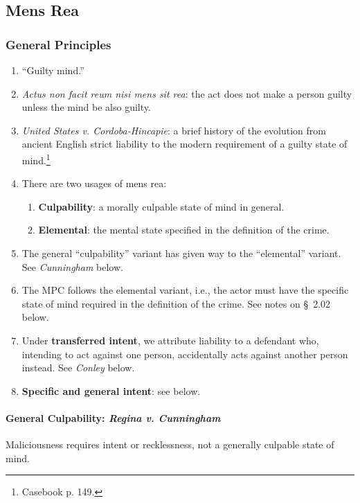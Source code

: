 \subsection{Mens Rea}

\subsubsection{General Principles}

\begin{enumerate}
    \item ``Guilty mind.''
    \item \emph{Actus non facit reum nisi mens sit rea}: the act does not make 
    a person guilty unless the mind be also guilty.
    \item \emph{United States v. Cordoba-Hincapie}: a brief history of the 
    evolution from ancient English strict liability to the modern requirement 
    of a guilty state of mind.\footnote{Casebook p. 149.}
    \item There are two usages of mens rea:
    \begin{enumerate}
        \item \textbf{Culpability}: a morally culpable state of mind in 
        general.
        \item \textbf{Elemental}: the mental state specified in the definition 
        of the crime.
    \end{enumerate}
    \item The general ``culpability'' variant has given way to the 
    ``elemental'' variant. See \emph{Cunningham} below.
    \item The MPC follows the elemental variant, i.e., the actor must have the 
    specific state of mind required in the definition of the crime. See 
    notes on \S\ 2.02 below.
    \item Under \textbf{transferred intent}, we attribute liability to a 
    defendant who, intending to act against one person, accidentally acts 
    against another person instead. See \emph{Conley} below.
    \item \textbf{Specific and general intent}: see below.
\end{enumerate}

\paragraph{General Culpability: \emph{Regina v. Cunningham}}

Maliciousness requires intent or recklessness, not a generally culpable state 
of mind.

